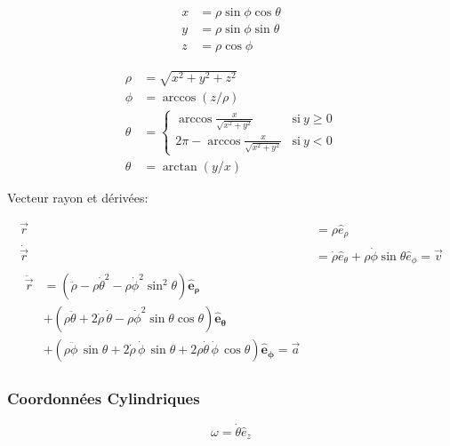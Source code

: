 \documentclass[10pt,a4paper]{article}
\begin{document}
\begin{multicols}{3}

\begin{align*}
x & = \rho \sin \phi \cos \theta \\
y & = \rho \sin \phi \sin \theta \\
z & = \rho \cos \phi
\end{align*}

\columnbreak



\columnbreak


\begin{align*}
\rho   &= \sqrt{x^2+y^2+z^2}\\
\phi &= \arccos(z/\rho)\\
\theta &= \begin{cases}\arccos\frac{x}{\sqrt{x^2+y^2}} & \mathrm{si}\ y\geq{0} \\ 2\pi-\arccos\frac x{\sqrt{x^2+y^2}} & \mathrm{si}\ y < 0\end{cases}\\
\theta &= \arctan(y/x)
\end{align*}

\end{multicols}

Vecteur rayon et dérivées:

\begin{align*}
\vec{r} &= \rho \hat{e}_{\rho} \\
\dot{\vec{r}} &= \dot{\rho}\hat{e}_{\theta} + \rho\dot{\phi}\sin\theta\hat{e}_{\phi} = \vec{v} \\
\begin{split}
\ddot{\vec{r}} &= \left( \ddot{\rho} - \rho\dot\theta^2 - \rho\dot\phi^2\sin^2\theta \right)\mathbf{\hat{e}_\rho} \\
&+ \left( \rho\ddot\theta + 2\dot{\rho}\,\dot\theta - \rho\dot\phi^2\sin\theta\cos\theta \right) \mathbf{\hat{e}_\theta}\\
&+ \left( \rho\ddot\phi\,\sin\theta + 2\dot{\rho}\,\dot\phi\,\sin\theta + 2 \rho\dot\theta\,\dot\phi\,\cos\theta \right) \mathbf{\hat{e}_\phi} = \vec{a}
\end{split}
\end{align*}

\subsubsection{Coordonnées Cylindriques}


$$\omega = \dot\theta \hat e_z$$
\end{document}
